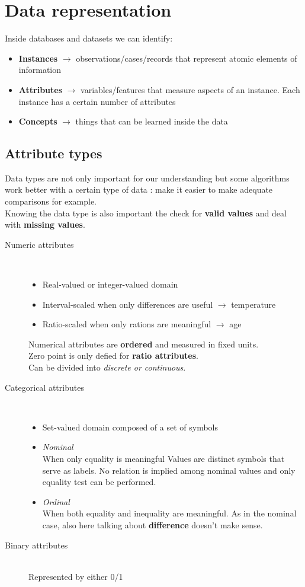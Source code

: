 \section{Data representation}
Inside databases and datasets we can identify:
\begin{itemize}
\item \textbf{Instances} $\to$ observations/cases/records that represent atomic elements of information
\item \textbf{Attributes} $\to$ variables/features that measure aspects of an instance. Each instance has a certain number of attributes
\item \textbf{Concepts} $\to$ things that can be learned inside the data
\end{itemize}

\subsection{Attribute types}
Data types are not only important for our understanding but some algorithms work better with a certain type of data : make it easier to make adequate comparisons for example. \\
Knowing the data type is also important the check for \textbf{valid values} and deal with \textbf{missing values}.
\begin{description}
\item[Numeric attributes]\hfill\\
\begin{itemize}
\item Real-valued or integer-valued domain
\item Interval-scaled when only differences are useful $\to$ temperature
\item Ratio-scaled when only rations are meaningful $\to$ age
\end{itemize}
Numerical attributes are \textbf{ordered} and measured in fixed units.\\
Zero point is only defied for \textbf{ratio attributes}.\\
Can be divided into \textit{discrete or continuous}.
\item[Categorical attributes]\hfill\\
\begin{itemize}
\item Set-valued domain composed of a set of symbols
\item \textit{Nominal}\\ When only equality is meaningful
Values are distinct symbols that serve as labels. No relation is implied among nominal values and only equality test can be performed.
\item \textit{Ordinal}\\When both equality and inequality are meaningful. As in the nominal case, also here talking about \textbf{difference} doesn't make sense.
\end{itemize}
\item[Binary attributes]\hfill\\
Represented by either 0/1

\end{description}
